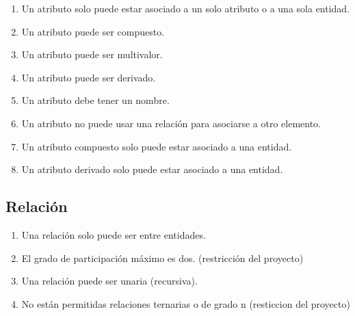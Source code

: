 \begin{enumerate}    
\item Un atributo solo puede estar asociado a un solo atributo o a una sola entidad.
\item Un atributo puede ser compuesto.
\item Un atributo puede ser multivalor.
\item Un atributo puede ser derivado.
\item Un atributo debe tener un nombre.
\item Un atributo no puede usar una relación para asociarse a otro elemento.
\item Un atributo compuesto solo puede estar asociado a una entidad.
\item Un atributo derivado solo puede estar asociado a una entidad.
\end{enumerate}

\subsection*{Relación}

\begin{enumerate}
    \item Una relación solo puede ser entre entidades.
    \item El grado de participación máximo es dos. (restricción del proyecto)
    \item Una relación puede ser unaria (recursiva).
    \item No están permitidas relaciones ternarias o de grado n (resticcion del proyecto)
\end{enumerate}